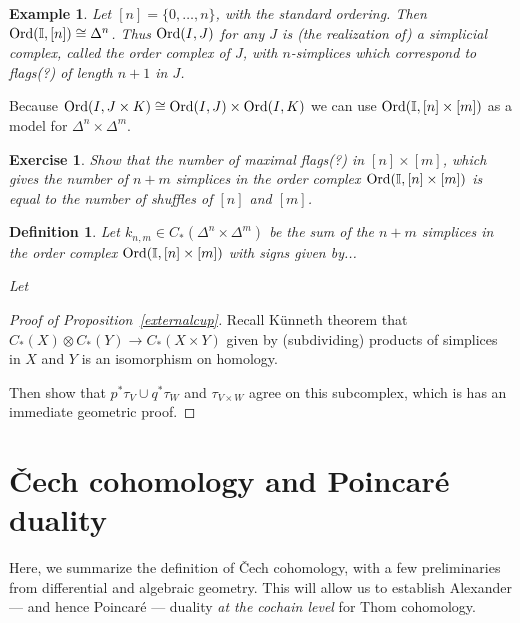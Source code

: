 \documentclass{amsart}          %
\newtheorem{definition}[theorem]{Definition}
\newtheorem{example}[theorem]{Example}
\newtheorem{exercise}[theorem]{Exercise}
\newcommand{\I}{\mathbb I}
\begin{document}
\begin{example}
Let $[n] = \{0, \ldots, n\}$, with the standard ordering.  Then ${\rm Ord}(\I, [n]) \cong \Delta^n$.  Thus  ${\rm Ord}(I,J)$ for any $J$
is (the realization of) a simplicial complex, called the order complex of $J$, with $n$-simplices which correspond to flags(?)
of length $n + 1$ in $J$.
\end{example}

Because ${\rm Ord}(I,J \times K) \cong {\rm Ord}(I,J) \times {\rm Ord}(I,K)$ we can use ${\rm Ord}(\I,[n] \times [m])$
as a model for $\Delta^n \times \Delta^m$.   

\begin{exercise}
Show that the number of maximal flags(?) in $[n] \times [m]$, which gives the number of
$n + m$ simplices in the order complex ${\rm Ord}(\I, [n] \times [m])$ is equal to the number of shuffles of $[n]$ and $[m]$.
\end{exercise}

\begin{definition}
Let $k_{n,m} \in C_*(\Delta^n \times \Delta^m)$ be the sum of the $n + m$ simplices in the order complex ${\rm Ord}(\I, [n] \times [m])$
with signs given by...  

Let 
\end{definition}


\begin{proof}[Proof of Proposition~\ref{externalcup}]
Recall K\"unneth theorem that  $C_*(X) \otimes C_*(Y) \to C_*(X \times Y)$ given by (subdividing) products of simplices in $X$ and $Y$ is an
isomorphism on homology.  

Then show that $p^* \tau_V \cup q^* \tau_W$ and $\tau_{V \times W}$ agree on this subcomplex, which is has an immediate
geometric proof.
\end{proof}

\section{\v{C}ech cohomology and Poincar\'{e} duality}
Here, we summarize the definition of \v{C}ech cohomology, with a few preliminaries from differential and algebraic geometry. This will allow us to establish Alexander --- and hence Poincar\'{e} --- duality \textit{at the cochain level} for Thom cohomology.
\end{document}
